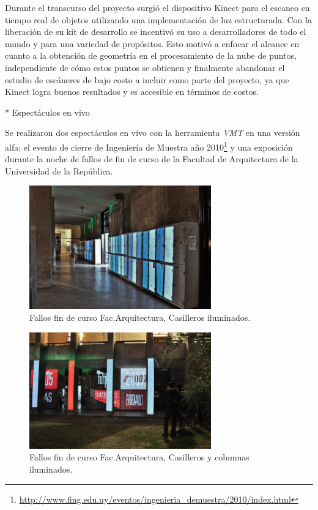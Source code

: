 Durante el transcurso del proyecto surgió el dispositivo Kinect para el escaneo en tiempo real de objetos utilizando una implementación de luz estructurada. Con la liberación de su kit de desarrollo se incentivó su uso a desarrolladores de todo el mundo y para una variedad de propósitos. Esto motivó a enfocar el alcance en cuanto a la obtención de geometría en el procesamiento de la nube de puntos, independiente de cómo estos puntos se obtienen y finalmente abandonar el estudio de escáneres de bajo costo a incluir como parte del proyecto, ya que Kinect logra buenos resultados y es accesible en términos de costos.

* Espectáculos en vivo

Se realizaron dos espectáculos en vivo con la herramienta \emph{VMT} en una versión alfa: el evento de cierre de Ingeniería de Muestra año 2010\footnote{\url{http://www.fing.edu.uy/eventos/ingenieria_demuestra/2010/index.html}} y una exposición durante la noche de fallos de fin de curso de la Facultad de Arquitectura de la Universidad de la República.

\begin{figure}[H]
  \centering
    \includegraphics[width=0.7\textwidth]{./Cap7_conclusiones/Arqui1.jpg}
  \caption[Fallos fin de curso Fac.Arquitectura, Casilleros iluminados]{Fallos fin de curso Fac.Arquitectura, Casilleros iluminados.}
  \label{fig:Arquitectura1}
\end{figure}

\begin{figure}[H]
  \centering
    \includegraphics[width=0.7\textwidth]{./Cap7_conclusiones/Arqui2.jpg}
  \caption[Fallos fin de curso Fac.Arquitectura, Casilleros y columnas iluminados]{Fallos fin de curso Fac.Arquitectura, Casilleros y columnas iluminados.}
  \label{fig:Arquitectura2}
\end{figure}

